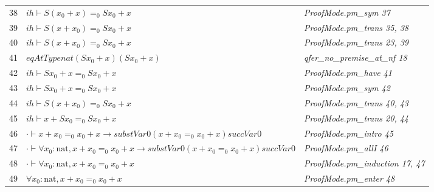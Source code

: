 \begin{longtable}{r l l}
38 & $ih  \vdash  S (x_{0}  +  x)  =_0  S x_{0}  +  x$ & \textit{ProofMode.pm\_sym 37} \\
39 & $ih  \vdash  S (x  +  x_{0})  =_0  S x_{0}  +  x$ & \textit{ProofMode.pm\_trans 35, 38} \\
40 & $ih  \vdash  S (x  +  x_{0})  =_0  S x_{0}  +  x$ & \textit{ProofMode.pm\_trans 23, 39} \\
41 & $eqAtType nat (S x_{0}  +  x) (S x_{0}  +  x)$ & \textit{qfer\_no\_premise\_at\_nf 18} \\
42 & $ih  \vdash  S x_{0}  +  x  =_0  S x_{0}  +  x$ & \textit{ProofMode.pm\_have 41} \\
43 & $ih  \vdash  S x_{0}  +  x  =_0  S x_{0}  +  x$ & \textit{ProofMode.pm\_sym 42} \\
44 & $ih  \vdash  S (x  +  x_{0})  =_0  S x_{0}  +  x$ & \textit{ProofMode.pm\_trans 40, 43} \\
45 & $ih  \vdash  x  +  S x_{0}  =_0  S x_{0}  +  x$ & \textit{ProofMode.pm\_trans 20, 44} \\
46 & $\cdot  \vdash  x  +  x_{0}  =_0  x_{0}  +  x  \to  substVar0 (x  +  x_{0}  =_0  x_{0}  +  x) succVar0$ & \textit{ProofMode.pm\_intro 45} \\
47 & $\cdot  \vdash  \forall  x_{0} : \mathrm{nat}, x  +  x_{0}  =_0  x_{0}  +  x  \to  substVar0 (x  +  x_{0}  =_0  x_{0}  +  x) succVar0$ & \textit{ProofMode.pm\_allI 46} \\
48 & $\cdot  \vdash  \forall  x_{0} : \mathrm{nat}, x  +  x_{0}  =_0  x_{0}  +  x$ & \textit{ProofMode.pm\_induction 17, 47} \\
49 & $\forall  x_{0} : \mathrm{nat}, x  +  x_{0}  =_0  x_{0}  +  x$ & \textit{ProofMode.pm\_enter 48} \\
\hline
\end{longtable}
